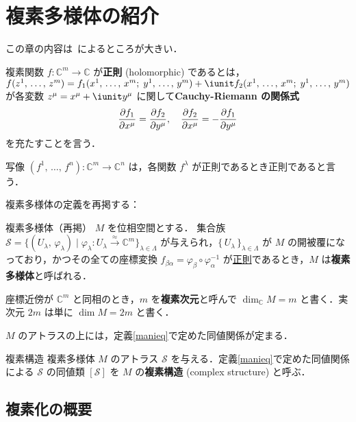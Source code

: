 \documentclass[geometry_main]{subfiles}
\begin{document}
\setcounter{chapter}{7}

\chapter{複素多様体の紹介}

この章の内容は~\cite[3.4]{EGH}によるところが大きい．

複素関数 $f \colon \mathbb{C}^m \to \mathbb{C}$ が\textbf{正則} (holomorphic) であるとは，$f(z^1,\, \dots ,\, z^m) = f_1(x^1,\, \dots ,\, x^m;\; y^1,\, \dots ,\, y^m) + \iunit f_2(x^1,\, \dots ,\, x^m;\; y^1,\, \dots ,\, y^m)$ が各変数 $z^\mu = x^\mu + \iunit y^\mu$ に関して\textbf{Cauchy-Riemann の関係式}
\begin{align} 
	\pdv{f_1}{x^\mu} = \pdv{f_2}{y^\mu},\quad \pdv{f_2}{x^\mu} = -\pdv{f_1}{y^\mu}
\end{align}
を充たすことを言う．

写像 $(f^1,\, \dots,\, f^n) \colon \mathbb{C}^m \to \mathbb{C}^n$ は，各関数 $f^\lambda$ が正則であるとき正則であると言う．

複素多様体の定義を再掲する：

\begin{mydef}[label=def.complexmani]{複素多様体（再掲）}
	$M$ を位相空間とする．
	集合族 $\mathcal{S} = \{(U_\lambda,\, \varphi_\lambda)\mid \varphi_\lambda \colon U_\lambda \xrightarrow{\approx} \mathbb{C}^m \}_{\lambda \in \Lambda}$ が与えられ，$\{\, U_\lambda \, \}_{\lambda \in \Lambda}$ が $M$ の開被覆になっており，かつその全ての座標変換 $f_{\beta\alpha} = \varphi_{\beta} \circ \varphi_{\alpha}^{-1}$ が\underline{正則}であるとき，$M$ は\textbf{複素多様体}と呼ばれる．

	座標近傍が $\mathbb{C}^m$ と同相のとき，$m$ を\textbf{複素次元}と呼んで $\dim_{\mathbb{C}} M = m$ と書く．実次元 $2m$ は単に $\dim M = 2m$ と書く．
\end{mydef}

$M$ のアトラスの上には，定義\ref{manieq}で定めた同値関係が定まる．

\begin{mydef}[label=complex_structure]{複素構造}
	複素多様体 $M$ のアトラス $\mathcal{S}$ を与える．定義\ref{manieq}で定めた同値関係による $\mathcal{S}$ の同値類 $[\mathcal{S}]$ を $M$ の\textbf{複素構造} (complex structure) と呼ぶ．
\end{mydef}

\section{複素化の概要}
\end{document}
